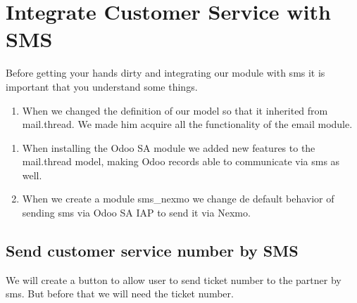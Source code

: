 \documentclass[letterpaper,10pt,english]{sphinxmanual}
\begin{document}
\section{Integrate Customer Service with SMS}
\label{\detokenize{technical:integrate-customer-service-with-sms}}
Before getting your hands dirty and integrating our module with sms it is important that you understand some things.
\begin{enumerate}
%
\item {} 
When we changed the definition of our model so that it inherited from mail.thread. We made him acquire all the functionality of the email module.

\end{enumerate}

%
\begin{sphinxVerbatim}[commandchars=\\\{\}]
 

      
      \PYG{p}{[} \PYG{p}{]}
\end{sphinxVerbatim}
\sphinxresetverbatimhllines
\begin{enumerate}
%
\setcounter{enumi}{1}
\item {} 
When installing the Odoo SA  module we added new features to the mail.thread model, making Odoo records able to communicate via sms as well.

\item {} 
When we create a module sms\_nexmo we change de default behavior of sending sms via Odoo SA IAP to send it via Nexmo.

\end{enumerate}


\subsection{Send customer service number by SMS}
\label{\detokenize{technical:send-customer-service-number-by-sms}}
We will create a button to allow user to send ticket number to the partner by sms. But before that we will need the ticket number.
\end{document}
